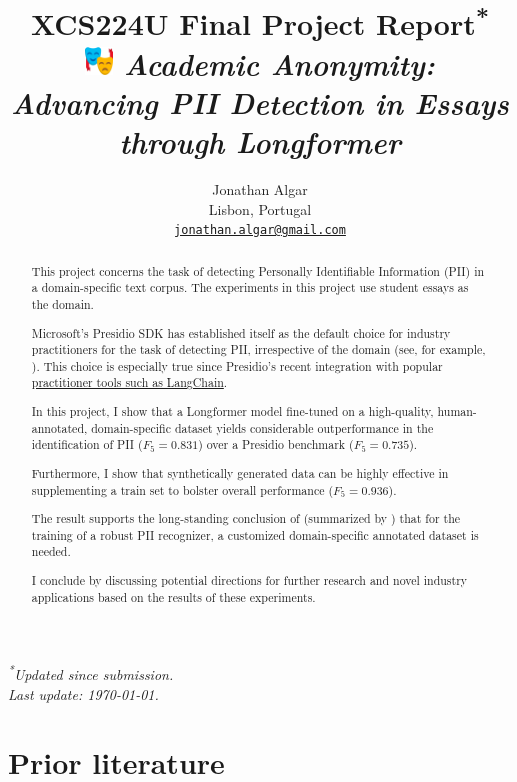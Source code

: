 \documentclass[11pt]{article}
\title{%
  XCS224U Final Project Report\textsuperscript{*} \\
  \includegraphics[height=1em]{images/emoji.png}%
  \hspace{0.1em} \textit{Academic Anonymity: Advancing PII Detection in Essays through Longformer}%
}
\author{Jonathan Algar \\
  Lisbon, Portugal \\
  \texttt{\href{mailto:jonathan.algar@gmail.com}{jonathan.algar@gmail.com}}
}
\begin{document}
\maketitle
\vspace{-1em}
\begin{center}
\small\textit{\textsuperscript{*}{Updated since submission. \\ Last update: \today}.}
\end{center}

\begin{abstract}

This project concerns the task of detecting Personally Identifiable Information (PII) in a domain-specific text corpus. The experiments in this project use student essays as the domain.

Microsoft's Presidio SDK \cite{Presidio} has established itself as the default choice for industry practitioners for the task of detecting PII, irrespective of the domain (see, for example, \citealt{AzizStraiton2023PIIDetection}). This choice is especially true since Presidio's recent integration with popular \href{https://python.langchain.com/docs/guides/productionization/safety/presidio_data_anonymization/}{practitioner tools such as LangChain}.

In this project, I show that a Longformer model \cite{abs-2004-05150} fine-tuned on a high-quality, human-annotated, domain-specific dataset yields considerable outperformance in the identification of PII ($F_5 = 0.831$) over a Presidio benchmark ($F_5 = 0.735$).

Furthermore, I show that synthetically generated data can be highly effective in supplementing a train set to bolster overall performance ($F_5 = 0.936$).

The result supports the long-standing conclusion of \citealt{Chen2015ASO} (summarized by \citealt{hathurusinghe-etal-2021-privacy}) that for the training of a robust PII recognizer, a customized domain-specific annotated dataset is needed.

I conclude by discussing potential directions for further research and novel industry applications based on the results of these experiments.

\end{abstract}

\section{Prior literature}
\end{document}
